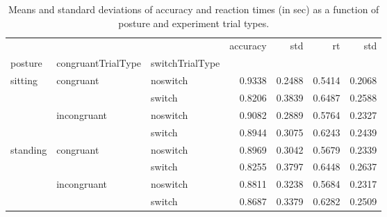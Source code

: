 \begin{table}
\centering
\caption{Means and standard deviations of accuracy and reaction times (in sec) as a function of posture and experiment trial types.}
\label{table-task-switching-replication-reaction-time}
\begin{tabular}{lllrrrr}
\toprule
         &             &        & accuracy &    std &     rt &    std \\
posture & congruantTrialType & switchTrialType &          &        &        &        \\
\midrule
sitting & congruant & noswitch &   0.9338 & 0.2488 & 0.5414 & 0.2068 \\
         &             & switch &   0.8206 & 0.3839 & 0.6487 & 0.2588 \\
         & incongruant & noswitch &   0.9082 & 0.2889 & 0.5764 & 0.2327 \\
         &             & switch &   0.8944 & 0.3075 & 0.6243 & 0.2439 \\
standing & congruant & noswitch &   0.8969 & 0.3042 & 0.5679 & 0.2339 \\
         &             & switch &   0.8255 & 0.3797 & 0.6448 & 0.2637 \\
         & incongruant & noswitch &   0.8811 & 0.3238 & 0.5684 & 0.2317 \\
         &             & switch &   0.8687 & 0.3379 & 0.6282 & 0.2509 \\
\bottomrule
\end{tabular}
\end{table}
